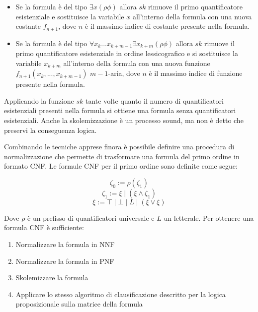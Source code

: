 \documentclass[./main.tex]{subfiles}
\begin{document}
\begin{itemize}
  \item Se la formula è del tipo $\exists x(\rho \phi)$ allora $sk$ rimuove il primo quantificatore esistenziale e sostituisce 
  la variabile $x$ all'interno della formula con una nuova costante $f_{n+1}$, dove $n$ è il massimo indice di costante presente nella formula.

  \item Se la formula è del tipo $\forall x_k ... x_{k+m-1} \exists x_{k+m} (\rho \phi)$ allora $sk$ rimuove 
  il primo quantificatore esistenziale in ordine lessicografico e si sostituisce la variabile $x_{k+m}$ all'interno della formula con una nuova funzione 
  $f_{n+1}(x_k, ... , x_{k+m-1})$
  $m-1$-aria, dove $n$ è il massimo indice di funzione presente nella formula.
\end{itemize}

Applicando la funzione $sk$ tante volte quanto il numero di quantificatori esistenziali presenti nella formula si ottiene una formula 
senza quantificatori esistenziali. Anche la skolemizzazione è un processo sound, ma non è detto che preservi la conseguenza logica.



Combinando le tecniche apprese finora è possibile definire una procedura di normalizzazione che permette di trasformare una formula del primo ordine
in formato CNF. Le formule CNF per il primo ordine sono definite come segue:

$$ \zeta_0 := \rho(\zeta_1) $$
$$ \zeta_1 := \xi \mid (\xi \land \zeta_1) $$
$$ \xi := \top \mid \bot \mid L \mid (\xi \lor \xi ) $$

Dove $\rho$ è un prefisso di quantificatori universale e $L$ un letterale. Per ottenere una formula CNF è sufficiente:

\begin{enumerate}
  \item Normalizzare la formula in NNF
  \item Normalizzare la formula in PNF
  \item Skolemizzare la formula
  \item Applicare lo stesso algoritmo di clausificazione descritto per la logica proposizionale sulla matrice della formula
\end{enumerate}
\end{document}
